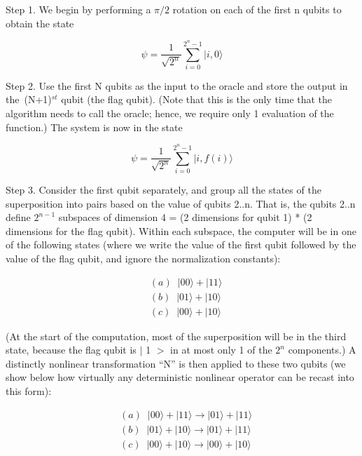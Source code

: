\documentclass{article}
\begin{document}
Step 1. We begin by performing a $\pi/2$ rotation on each of the first n
qubits to obtain the state%

\begin{equation}
\psi=\frac{1}{\sqrt{2^{n}}}\sum\limits_{i=0}^{2^{n}-1}|i,0\rangle
\end{equation}

Step 2. Use the first N qubits as the input to the oracle and store the output
in the\ (N+1)$^{st}$ qubit (the flag qubit). (Note that this is the only time
that the algorithm needs to call the oracle; hence, we require only 1
evaluation of the function.) The system is now in the state%

\begin{equation}
\psi=\frac{1}{\sqrt{2^{n}}}\sum\limits_{i=0}^{2^{n}-1}|i,f(i)\rangle
\end{equation}

Step 3. Consider the first qubit separately, and group all the states of the
superposition into pairs based on the value of qubits 2..n. That is, the
qubits 2..n define $2^{n-1}$ subspaces of dimension 4 = (2 dimensions for
qubit 1) * (2 dimensions for the flag qubit). Within each subspace, the
computer will be in one of the following states (where we write the value of
the first qubit followed by the value of the flag qubit, and ignore the
normalization constants):%

\begin{align}
&  (a)\;\;|00\rangle+|11\rangle\nonumber\\
&  (b)\;\;|01\rangle+|10\rangle\\
&  (c)\;\;|00\rangle+|10\rangle\nonumber
\end{align}

(At the start of the computation, most of the superposition will be in the
third state, because the flag qubit is
$\vert$%
1%
$>$%
in at most only 1 of the $2^{n}$ components.) A distinctly nonlinear
transformation ``N'' is then applied to these two qubits (we show below how
virtually any deterministic nonlinear operator can be recast into this form):%

\begin{align}
&  (a)\;\;|00\rangle+|11\rangle\longrightarrow|01\rangle+|11\rangle\nonumber\\
&  (b)\;\;|01\rangle+|10\rangle\longrightarrow|01\rangle+|11\rangle\\
&  (c)\;\;|00\rangle+|10\rangle\longrightarrow|00\rangle+|10\rangle\nonumber
\end{align}
\end{document}
